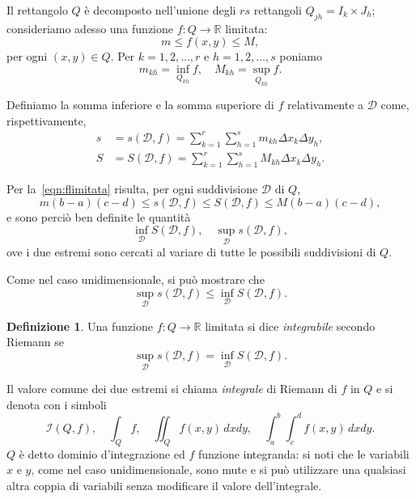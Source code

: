 \documentclass[a4paper]{book}
\numberwithin{equation}{section}
\theoremstyle{plain}
\theoremstyle{definition}
\newtheorem{defn}{Definizione}[section]
\theoremstyle{remark}
\theoremstyle{example}
\begin{document}
		Il rettangolo $Q$ è decomposto nell'unione degli $rs$ rettangoli $Q_{jh} = I_k \times J_h$; consideriamo adesso una funzione $f \colon Q \to \mathbb{R}$ limitata:
		\begin{equation}
			\label{eqn:flimitata}
			m \le f(x, y) \le M,
		\end{equation}
		per ogni $(x, y) \in Q$.
		Per $k = 1, 2, \dots, r$ e $h = 1, 2, \dots, s$ poniamo
		\begin{equation}
			m_{kh} = \inf_{Q_{kh}}f, \quad M_{kh} = \sup_{Q_{kh}} f.
		\end{equation}

		Definiamo la somma inferiore e la somma superiore di $f$ relativamente a $\mathcal{D}$ come, rispettivamente,
		\begin{align*}
			s &= s(\mathcal{D}, f) = \sum_{k=1}^r\sum_{h=1}^s m_{kh}\Delta x_k \Delta y_h, \\
			S &= S(\mathcal{D}, f) = \sum_{k=1}^r \sum_{h=1}^s M_{kh} \Delta x_k \Delta y_h.
		\end{align*}

		Per la~\eqref{eqn:flimitata} risulta, per ogni suddivisione $\mathcal{D}$ di $Q$,
		\begin{equation*}
			m(b -a )(c-d) \le s(\mathcal{D}, f) \le S(\mathcal{D}, f) \le M(b-a)(c-d),
		\end{equation*}
		e sono perciò ben definite le quantità
		\begin{equation*}
			\inf_{\mathcal{D}}S(\mathcal{D}, f), \quad \sup_{\mathcal{D}}s(\mathcal{D}, f),
		\end{equation*}
		ove i due estremi sono cercati al variare di tutte le possibili suddivisioni di $Q$.

		Come nel caso unidimensionale, si può mostrare che
		\begin{equation*}
			\sup_{\mathcal{D}} s(\mathcal{D}, f) \le \inf_{\mathcal{D}} S(\mathcal{D}, f).
		\end{equation*}

		\begin{defn}
			Una funzione $f \colon Q \to \mathbb{R}$ limitata si dice \emph{integrabile} secondo Riemann se
			\begin{equation*}
				\sup_{\mathcal{D}} s(\mathcal{D}, f) = \inf_{\mathcal{D}} S(\mathcal{D}, f).
			\end{equation*}
		\end{defn}

		Il valore comune dei due estremi si chiama \emph{integrale} di Riemann di $f$ in $Q$ e si denota con i simboli
		\begin{equation*}
			\mathcal{I}(Q, f), \quad \int_Q f, \quad \iint_Q f(x,y)\, dxdy, \quad \int_a^b \int_c^d f(x,y) \, dxdy.
		\end{equation*}
		$Q$ è detto dominio d'integrazione ed $f$ funzione integranda: si noti che le variabili $x$ e $y$, come nel caso unidimensionale, sono mute e si può utilizzare una qualsiasi altra coppia di variabili senza modificare il valore dell'integrale.
\end{document}
